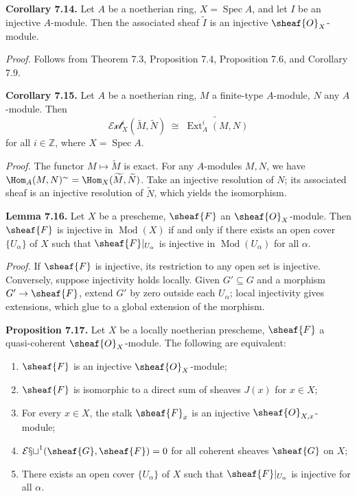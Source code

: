 \textbf{Corollary 7.14.}
Let $A$ be a noetherian ring, $X=\operatorname{Spec}A$, and let $I$ be an injective $A$-module. Then the associated sheaf $\widetilde{I}$ is an injective $\sheaf{O}_X$-module.

\textit{Proof.}
Follows from Theorem 7.3, Proposition 7.4, Proposition 7.6, and Corollary 7.9.

\textbf{Corollary 7.15.}
Let $A$ be a noetherian ring, $M$ a finite-type $A$-module, $N$ any $A$-module. Then
\[
\mathcal{Ext}_X^i(\widetilde{M},\widetilde{N}) \;\cong\; \widetilde{\operatorname{Ext}_A^i(M,N)}
\]
for all $i\in\mathbb{Z}$, where $X=\operatorname{Spec}A$.

\textit{Proof.}
The functor $M\mapsto\widetilde{M}$ is exact. For any $A$-modules $M,N$, we have
$\Hom_A(M,N)^\sim = \Hom_X(\widetilde{M},\widetilde{N})$.
Take an injective resolution of $N$; its associated sheaf is an injective resolution of $\widetilde{N}$, which yields the isomorphism.

\setcounter{page}{131}
\textbf{Lemma 7.16.}
Let $X$ be a prescheme, $\sheaf{F}$ an $\sheaf{O}_X$-module. Then $\sheaf{F}$ is injective in $\operatorname{Mod}(X)$ if and only if there exists an open cover $\{U_\alpha\}$ of $X$ such that $\sheaf{F}|_{U_\alpha}$ is injective in $\operatorname{Mod}(U_\alpha)$ for all $\alpha$.

\textit{Proof.}
If $\sheaf{F}$ is injective, its restriction to any open set is injective.
Conversely, suppose injectivity holds locally. Given $G'\subseteq G$ and a morphism $G'\to\sheaf{F}$, extend $G'$ by zero outside each $U_\alpha$; local injectivity gives extensions, which glue to a global extension of the morphism.

\setcounter{page}{132}
\textbf{Proposition 7.17.}
Let $X$ be a locally noetherian prescheme, $\sheaf{F}$ a quasi-coherent $\sheaf{O}_X$-module. The following are equivalent:
\begin{enumerate}
\item[(i)] $\sheaf{F}$ is an injective $\sheaf{O}_X$-module;
\item[(ii)] $\sheaf{F}$ is isomorphic to a direct sum of sheaves $J(x)$ for $x\in X$;
\item[(iii)] For every $x\in X$, the stalk $\sheaf{F}_x$ is an injective $\sheaf{O}_{X,x}$-module;
\item[(iv)] $\mathcal{Ext}^1(\sheaf{G},\sheaf{F})=0$ for all coherent sheaves $\sheaf{G}$ on $X$;
\item[(v)] There exists an open cover $\{U_\alpha\}$ of $X$ such that $\sheaf{F}|_{U_\alpha}$ is injective for all $\alpha$.
\end{enumerate}

